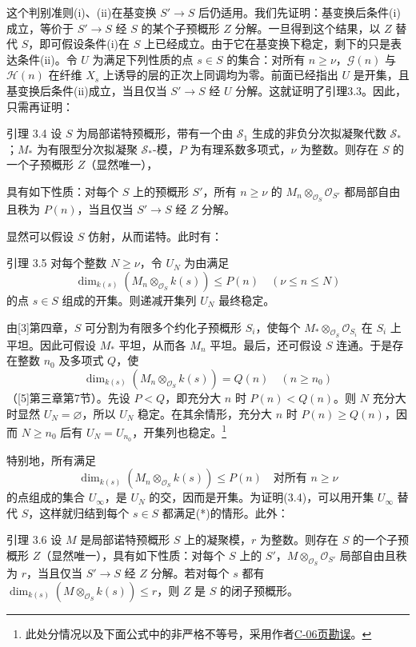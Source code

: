 这个判别准则(i)、(ii)在基变换 $S'\to S$ 后仍适用。我们先证明：基变换后条件(i)成立，等价于 $S'\to S$ 经 $S$ 的某个子预概形 $Z$ 分解。一旦得到这个结果，以 $Z$ 替代 $S$，即可假设条件(i)在 $S$ 上已经成立。由于它在基变换下稳定，剩下的只是表达条件(ii)。令 $U$ 为满足下列性质的点 $s\in S$ 的集合：对所有 $n\geq\nu$，$\mathcal G(n)$ 与 $\mathcal H(n)$ 在纤维 $X_s$ 上诱导的层的正次上同调均为零。前面已经指出 $U$ 是开集，且基变换后条件(ii)成立，当且仅当 $S'\to S$ 经 $U$ 分解。这就证明了引理3.3。因此，只需再证明：

\begin{statement}{引理 3.4}
设 $S$ 为局部诺特预概形，带有一个由 $\mathcal S_1$ 生成的非负分次拟凝聚代数 $\mathcal S_*$；$M_*$ 为有限型分次拟凝聚 $\mathcal S_*$-模，$P$ 为有理系数多项式，$\nu$ 为整数。则存在 $S$ 的一个子预概形 $Z$（显然唯一），

具有如下性质：对每个 $S$ 上的预概形 $S'$，所有 $n\geq\nu$ 的 $M_n\otimes_{\mathcal O_S}\mathcal O_{S'}$ 都局部自由且秩为 $P(n)$，当且仅当 $S'\to S$ 经 $Z$ 分解。
\end{statement}
显然可以假设 $S$ 仿射，从而诺特。此时有：

\begin{statement}{引理 3.5}
对每个整数 $N\geq\nu$，令 $U_N$ 为由满足
\[
\dim_{k(s)}(M_n\otimes_{\mathcal O_S}k(s))\leq P(n)
\quad(\nu\leq n\leq N)
\]
的点 $s\in S$ 组成的开集。则递减开集列 $U_N$ 最终稳定。
\end{statement}
由[3]第四章，$S$ 可分割为有限多个约化子预概形 $S_i$，使每个 $M_*\otimes_{\mathcal O_S}\mathcal O_{S_i}$ 在 $S_i$ 上平坦。因此可假设 $M_*$ 平坦，从而各 $M_n$ 平坦。最后，还可假设 $S$ 连通。于是存在整数 $n_0$ 及多项式 $Q$，使
\[
\dim_{k(s)}(M_n\otimes_{\mathcal O_S}k(s))=Q(n)
\quad(n\geq n_0)
\]
（[5]第三章第7节）。先设 $P<Q$，即充分大 $n$ 时 $P(n)<Q(n)$。则 $N$ 充分大时显然 $U_N=\varnothing$，所以 $U_N$ 稳定。在其余情形，充分大 $n$ 时 $P(n)\geq Q(n)$，因而 $N\geq n_0$ 后有 $U_N=U_{n_0}$，开集列也稳定。\footnote{此处分情况以及下面公式中的非严格不等号，采用作者\hyperref[orig:8]{C-06页勘误}。}

特别地，所有满足
\[
\dim_{k(s)}(M_n\otimes_{\mathcal O_S}k(s))\leq P(n)
\quad\text{对所有 }n\geq\nu\tag{*}
\]
的点组成的集合 $U_\infty$，是 $U_N$ 的交，因而是开集。为证明(3.4)，可以用开集 $U_\infty$ 替代 $S$，这样就归结到每个 $s\in S$ 都满足(*)的情形。此外：

\begin{statement}{引理 3.6}
设 $M$ 是局部诺特预概形 $S$ 上的凝聚模，$r$ 为整数。则存在 $S$ 的一个子预概形 $Z$（显然唯一），具有如下性质：对每个 $S$ 上的 $S'$，$M\otimes_{\mathcal O_S}\mathcal O_{S'}$ 局部自由且秩为 $r$，当且仅当 $S'\to S$ 经 $Z$ 分解。若对每个 $s$ 都有 $\dim_{k(s)}(M\otimes_{\mathcal O_S}k(s))\leq r$，则 $Z$ 是 $S$ 的闭子预概形。
\end{statement}

